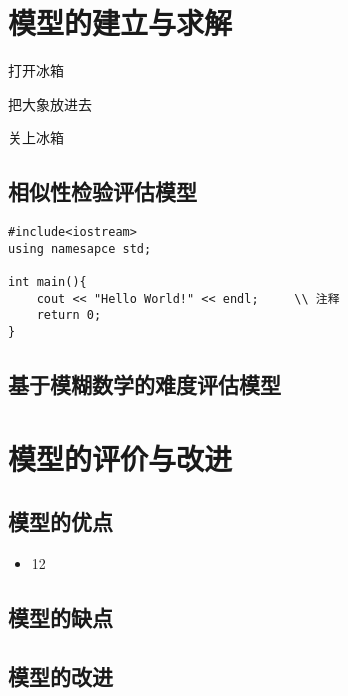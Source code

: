 \section{模型的建立与求解}

\begin{mgAlgorithm}
    \item 打开冰箱
    \item 把大象放进去
    \item 关上冰箱
\end{mgAlgorithm}

\subsection{相似性检验评估模型}



\begin{mgCodeBlock}
\end{mgCodeBlock}

\begin{mgCodeBlock}
\begin{verbatim}
#include<iostream>
using namesapce std;

int main(){
    cout << "Hello World!" << endl;     \\ 注释
    return 0;
}
\end{verbatim}
\end{mgCodeBlock}

\subsection{基于模糊数学的难度评估模型}

\subsection{}

%
%

\section{模型的评价与改进}

\subsection{模型的优点}

\begin{itemize}
    \item 12
\end{itemize}

\subsection{模型的缺点}

\subsection{模型的改进}